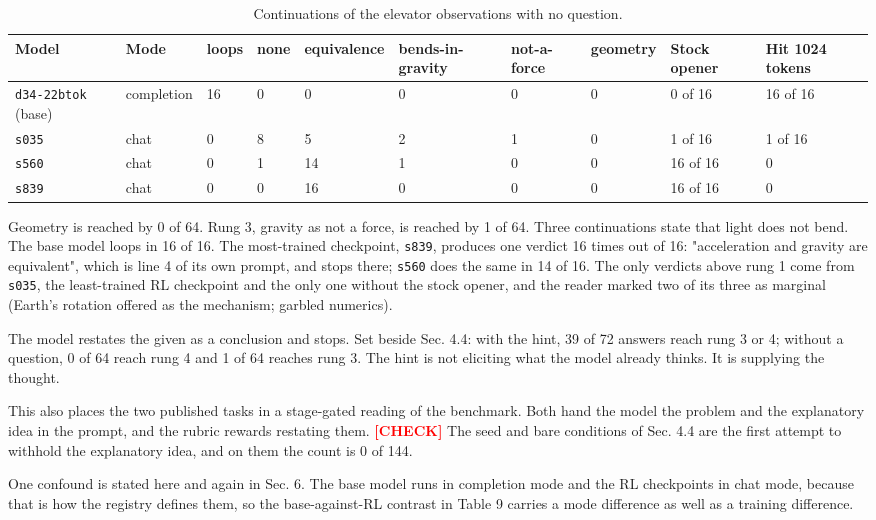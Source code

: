 \documentclass[reprint,prx,amsmath,amssymb,aps,superscriptaddress]{revtex4-2}
\begin{document}
\begin{table}[t]
\caption{Continuations of the elevator observations with no question.}
\begin{ruledtabular}
\begin{tabular}{llllllllll}
Model & Mode & loops & none & equivalence & bends-in-gravity & not-a-force & geometry & Stock opener & Hit 1024 tokens \\
\hline
\texttt{d34-22btok} (base) & completion & 16 & 0 & 0 & 0 & 0 & 0 & 0 of 16 & 16 of 16 \\
\texttt{s035} & chat & 0 & 8 & 5 & 2 & 1 & 0 & 1 of 16 & 1 of 16 \\
\texttt{s560} & chat & 0 & 1 & 14 & 1 & 0 & 0 & 16 of 16 & 0 \\
\texttt{s839} & chat & 0 & 0 & 16 & 0 & 0 & 0 & 16 of 16 & 0 \\
\end{tabular}
\end{ruledtabular}
\end{table}

Geometry is reached by 0 of 64. Rung 3, gravity as not a force, is reached by 1 of 64. Three continuations state that light does not bend. The base model loops in 16 of 16. The most-trained checkpoint, \texttt{s839}, produces one verdict 16 times out of 16: "acceleration and gravity are equivalent", which is line 4 of its own prompt, and stops there; \texttt{s560} does the same in 14 of 16. The only verdicts above rung 1 come from \texttt{s035}, the least-trained RL checkpoint and the only one without the stock opener, and the reader marked two of its three as marginal (Earth's rotation offered as the mechanism; garbled numerics).

The model restates the given as a conclusion and stops. Set beside Sec. 4.4: with the hint, 39 of 72 answers reach rung 3 or 4; without a question, 0 of 64 reach rung 4 and 1 of 64 reaches rung 3. The hint is not eliciting what the model already thinks. It is supplying the thought.

This also places the two published tasks in a stage-gated reading of the benchmark. Both hand the model the problem and the explanatory idea in the prompt, and the rubric rewards restating them. \textbf{\textcolor{red}{[CHECK]}} The seed and bare conditions of Sec. 4.4 are the first attempt to withhold the explanatory idea, and on them the count is 0 of 144.

One confound is stated here and again in Sec. 6. The base model runs in completion mode and the RL checkpoints in chat mode, because that is how the registry defines them, so the base-against-RL contrast in Table 9 carries a mode difference as well as a training difference.
\end{document}
